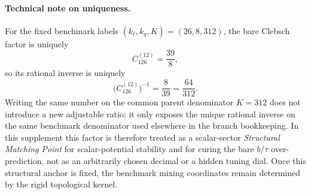 \documentclass[11pt]{article}
\begin{document}
\paragraph{Technical note on uniqueness.}
For the fixed benchmark labels $(k_{\ell},k_q,K)=(26,8,312)$, the bare Clebsch factor is uniquely
\begin{equation}
 C_{126}^{(12)}=\frac{39}{8},
\end{equation}
so its rational inverse is uniquely
\begin{equation}
 \bigl(C_{126}^{(12)}\bigr)^{-1}=\frac{8}{39}=\frac{64}{312}.
\end{equation}
Writing the same number on the common parent denominator $K=312$ does not introduce a new adjustable ratio; it only exposes the unique rational inverse on the same benchmark denominator used elsewhere in the branch bookkeeping. In this supplement this factor is therefore treated as a scalar-sector \emph{Structural Matching Point} for scalar-potential stability and for curing the bare $b/\tau$ over-prediction, not as an arbitrarily chosen decimal or a hidden tuning dial. Once this structural anchor is fixed, the benchmark mixing coordinates remain determined by the rigid topological kernel.
\end{document}
